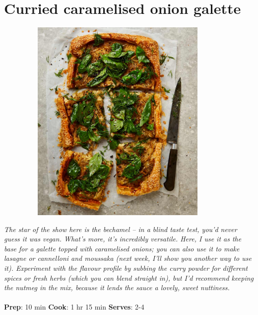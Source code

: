 \documentclass{book}
\begin{document}
\section{Curried caramelised onion galette}
\begin{figure}
\centering\includegraphics[width=10cm,height=10cm,keepaspectratio]{Recipe_Pictures/Curried_caramelised_onion_galette.png}
\end{figure}
\emph{The star of the show here is the bechamel – in a blind taste test, you’d never guess it was vegan. What’s more, it’s incredibly versatile. Here, I use it as the base for a galette topped with caramelised onions; you can also use it to make lasagne or cannelloni and moussaka (next week, I’ll show you another way to use it). Experiment with the flavour profile by subbing the curry powder for different spices or fresh herbs (which you can blend straight in), but I’d recommend keeping the nutmeg in the mix, because it lends the sauce a lovely, sweet nuttiness.}\\\\ 
\textbf{Prep}: 10 min
\textbf{Cook}: 1 hr 15 min
\textbf{Serves}: 2-4
\end{document}
